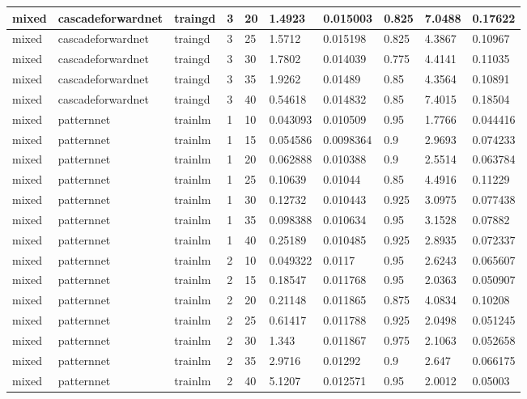 \begin{longtable}{lllllllll}
mixed & cascadeforwardnet & traingd & 3 & 20 & 1.4923 & 0.015003 & 0.825 & 7.0488 & 0.17622 \\ \hline 
mixed & cascadeforwardnet & traingd & 3 & 25 & 1.5712 & 0.015198 & 0.825 & 4.3867 & 0.10967 \\ \hline 
mixed & cascadeforwardnet & traingd & 3 & 30 & 1.7802 & 0.014039 & 0.775 & 4.4141 & 0.11035 \\ \hline 
mixed & cascadeforwardnet & traingd & 3 & 35 & 1.9262 & 0.01489 & 0.85 & 4.3564 & 0.10891 \\ \hline 
mixed & cascadeforwardnet & traingd & 3 & 40 & 0.54618 & 0.014832 & 0.85 & 7.4015 & 0.18504 \\ \hline 
mixed & patternnet & trainlm & 1 & 10 & 0.043093 & 0.010509 & 0.95 & 1.7766 & 0.044416 \\ \hline 
mixed & patternnet & trainlm & 1 & 15 & 0.054586 & 0.0098364 & 0.9 & 2.9693 & 0.074233 \\ \hline 
mixed & patternnet & trainlm & 1 & 20 & 0.062888 & 0.010388 & 0.9 & 2.5514 & 0.063784 \\ \hline 
mixed & patternnet & trainlm & 1 & 25 & 0.10639 & 0.01044 & 0.85 & 4.4916 & 0.11229 \\ \hline 
mixed & patternnet & trainlm & 1 & 30 & 0.12732 & 0.010443 & 0.925 & 3.0975 & 0.077438 \\ \hline 
mixed & patternnet & trainlm & 1 & 35 & 0.098388 & 0.010634 & 0.95 & 3.1528 & 0.07882 \\ \hline 
mixed & patternnet & trainlm & 1 & 40 & 0.25189 & 0.010485 & 0.925 & 2.8935 & 0.072337 \\ \hline 
mixed & patternnet & trainlm & 2 & 10 & 0.049322 & 0.0117 & 0.95 & 2.6243 & 0.065607 \\ \hline 
mixed & patternnet & trainlm & 2 & 15 & 0.18547 & 0.011768 & 0.95 & 2.0363 & 0.050907 \\ \hline 
mixed & patternnet & trainlm & 2 & 20 & 0.21148 & 0.011865 & 0.875 & 4.0834 & 0.10208 \\ \hline 
mixed & patternnet & trainlm & 2 & 25 & 0.61417 & 0.011788 & 0.925 & 2.0498 & 0.051245 \\ \hline 
mixed & patternnet & trainlm & 2 & 30 & 1.343 & 0.011867 & 0.975 & 2.1063 & 0.052658 \\ \hline 
mixed & patternnet & trainlm & 2 & 35 & 2.9716 & 0.01292 & 0.9 & 2.647 & 0.066175 \\ \hline 
mixed & patternnet & trainlm & 2 & 40 & 5.1207 & 0.012571 & 0.95 & 2.0012 & 0.05003 \\ \hline 

\end{longtable}
